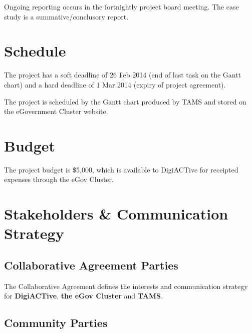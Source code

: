\documentclass[12pt,a4paper,twosided]{article}
\begin{document}
Ongoing reporting occurs in the fortnightly project board meeting. The
case study is a summative/conclusory report.

\section{Schedule}

The project has a soft deadline of 26 Feb 2014 (end of last task on the
Gantt chart) and a hard deadline of 1 Mar 2014 (expiry of project
agreement).

The project is scheduled by the Gantt chart produced by TAMS and stored
on the eGovernment Cluster website.

\section{Budget}

The project budget is \$5,000, which is available to DigiACTive for
receipted expenses through the eGov Cluster.

\section{Stakeholders \& Communication Strategy}

\subsection{Collaborative Agreement Parties}

The Collaborative Agreement defines the interests and communication
strategy for \textbf{DigiACTive}, \textbf{the eGov Cluster} and
\textbf{TAMS}.

\subsection{Community Parties}
\end{document}
